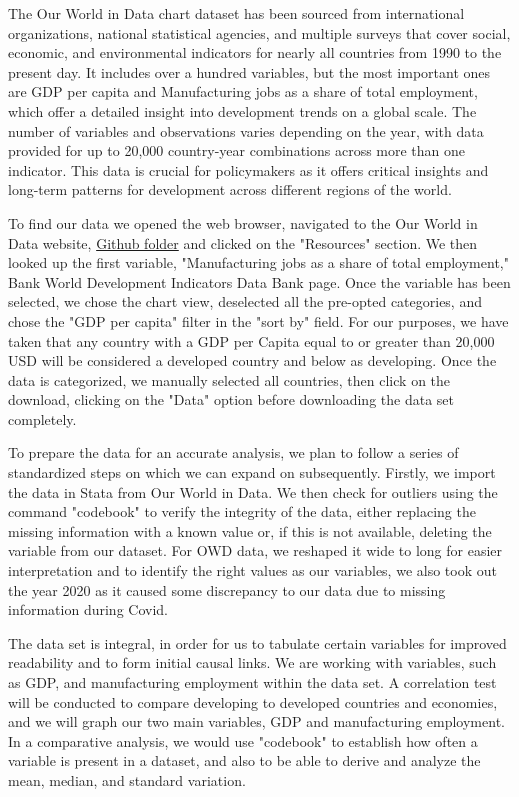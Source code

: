 \documentclass[12pt]{article}
\begin{document}
The Our World in Data chart dataset has been sourced from international organizations, national statistical agencies, and multiple surveys that cover social, economic, and environmental indicators for nearly all countries from 1990 to the present day. It includes over a hundred variables, but the most important ones are GDP per capita and Manufacturing jobs as a share of total employment, which offer a detailed insight into development trends on a global scale. The number of variables and observations varies depending on the year, with data provided for up to 20,000 country-year combinations across more than one indicator. This data is crucial for policymakers as it offers critical insights and long-term patterns for development across different regions of the world.

To find our data we opened the web browser, navigated to the Our World in Data website, \href{https://github.com/ecn310/course-project-development/issues/12}{Github folder} and clicked on the "Resources" section. We then looked up the first variable, "Manufacturing jobs as a share of total employment," Bank World Development Indicators Data Bank page. Once the variable has been selected, we chose the chart view, deselected all the pre-opted categories, and chose the "GDP per capita" filter in the "sort by" field. For our purposes, we have taken that any country with a GDP per Capita equal to or greater than 20,000 USD will be considered a developed country and below as developing. Once the data is categorized, we manually selected all countries, then click on the download, clicking on the "Data" option before downloading the data set completely. 

To prepare the data for an accurate analysis, we plan to follow a series of standardized steps on which we can expand on subsequently. Firstly, we import the data in Stata from Our World in Data. We then check for outliers using the command "codebook" to verify the integrity of the data, either replacing the missing information with a known value or, if this is not available, deleting the variable from our dataset.  For OWD data, we reshaped it wide to long for easier interpretation and to identify the right values as our variables, we also took out the year 2020 as it caused some discrepancy to our data due to missing information during Covid. 

The data set is integral, in order for us to tabulate certain variables for improved readability and to form initial causal links. We are working with variables, such as GDP, and manufacturing employment within the data set. A correlation test will be conducted to compare developing to developed countries and economies, and we will graph our two main variables, GDP and manufacturing employment. In a comparative analysis, we would use "codebook" to establish how often a variable is present in a dataset, and also to be able to derive and analyze the mean, median, and standard variation.
\end{document}
